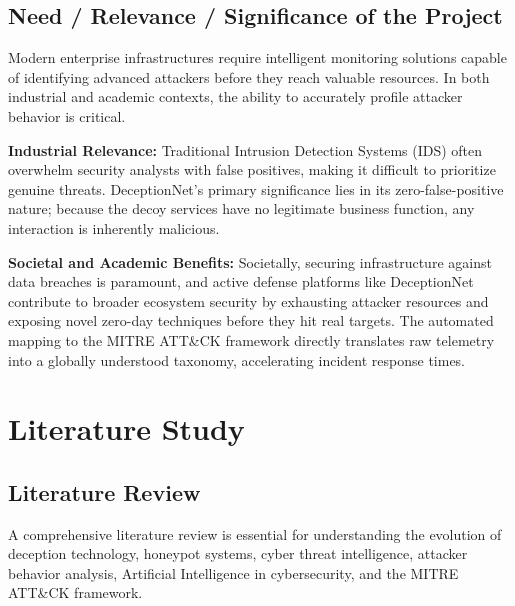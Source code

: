 \documentclass[12pt,a4paper]{report}
\begin{document}
\section{Need / Relevance / Significance of the Project}
Modern enterprise infrastructures require intelligent monitoring solutions capable of identifying advanced attackers before they reach valuable resources. In both industrial and academic contexts, the ability to accurately profile attacker behavior is critical. 

\textbf{Industrial Relevance:} Traditional Intrusion Detection Systems (IDS) often overwhelm security analysts with false positives, making it difficult to prioritize genuine threats. DeceptionNet’s primary significance lies in its zero-false-positive nature; because the decoy services have no legitimate business function, any interaction is inherently malicious. 

\textbf{Societal and Academic Benefits:} Societally, securing infrastructure against data breaches is paramount, and active defense platforms like DeceptionNet contribute to broader ecosystem security by exhausting attacker resources and exposing novel zero-day techniques before they hit real targets. The automated mapping to the MITRE ATT\&CK framework directly translates raw telemetry into a globally understood taxonomy, accelerating incident response times.

\clearpage


\chapter{Literature Study}

\section{Literature Review}
A comprehensive literature review is essential for understanding the evolution of deception technology, honeypot systems, cyber threat intelligence, attacker behavior analysis, Artificial Intelligence in cybersecurity, and the MITRE ATT\&CK framework.
\end{document}
